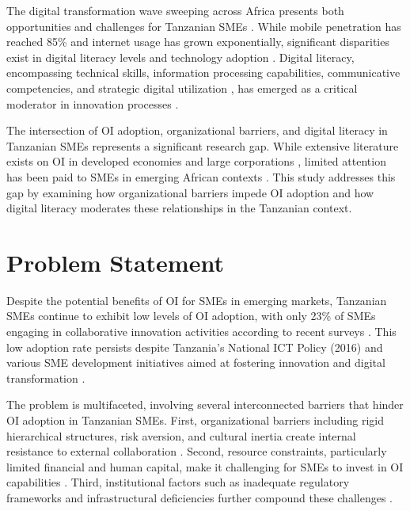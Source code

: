 The digital transformation wave sweeping across Africa presents both opportunities and challenges for Tanzanian SMEs \citep{itu2022digital}. While mobile penetration has reached 85\% and internet usage has grown exponentially, significant disparities exist in digital literacy levels and technology adoption \citep{gsma2023mobile}. Digital literacy, encompassing technical skills, information processing capabilities, communicative competencies, and strategic digital utilization \citep{eshet2004digital}, has emerged as a critical moderator in innovation processes \citep{peters2019digital}.

The intersection of OI adoption, organizational barriers, and digital literacy in Tanzanian SMEs represents a significant research gap. While extensive literature exists on OI in developed economies and large corporations \citep{chiaroni2011much}, limited attention has been paid to SMEs in emerging African contexts \citep{kiraka2013understanding}. This study addresses this gap by examining how organizational barriers impede OI adoption and how digital literacy moderates these relationships in the Tanzanian context.

\section{Problem Statement}

Despite the potential benefits of OI for SMEs in emerging markets, Tanzanian SMEs continue to exhibit low levels of OI adoption, with only 23\% of SMEs engaging in collaborative innovation activities according to recent surveys \citep{tanzania2022innovation}. This low adoption rate persists despite Tanzania's National ICT Policy (2016) and various SME development initiatives aimed at fostering innovation and digital transformation \citep{tanzania2016ict}.

The problem is multifaceted, involving several interconnected barriers that hinder OI adoption in Tanzanian SMEs. First, organizational barriers including rigid hierarchical structures, risk aversion, and cultural inertia create internal resistance to external collaboration \citep{morgan2006characteristics}. Second, resource constraints, particularly limited financial and human capital, make it challenging for SMEs to invest in OI capabilities \citep{bigliardi2012open}. Third, institutional factors such as inadequate regulatory frameworks and infrastructural deficiencies further compound these challenges \citep{lundvall2007national}.

